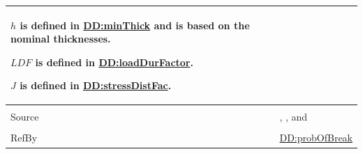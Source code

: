 \documentclass[12pt]{article}
\begin{document}
\begin{minipage}{\textwidth}
\begin{tabular}{>{\raggedright}p{}>{\raggedright\arraybackslash}p{}}
        $h$ is defined in \hyperref[DD:minThick]{DD:minThick} and is based on the nominal thicknesses.
        
        $\mathit{LDF}$ is defined in \hyperref[DD:loadDurFactor]{DD:loadDurFactor}.
        
        $J$ is defined in \hyperref[DD:stressDistFac]{DD:stressDistFac}.
        
\\ \midrule \\
Source & \cite{astm2009}, \cite[(Eqs. 4-5)]{beasonEtAl1998}, and \cite[(Eq. 14)]{campidelli}
         
\\ \midrule \\
RefBy & \hyperref[DD:probOfBreak]{DD:probOfBreak}
        
\\ \bottomrule
\end{tabular}
\end{minipage}
\end{document}
